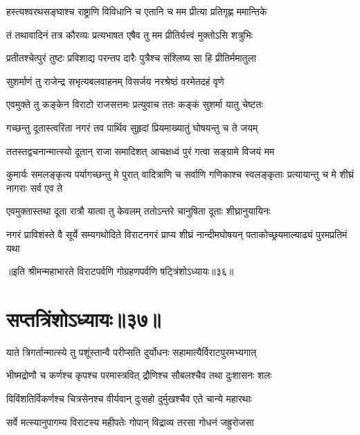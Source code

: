\twolineshloka
{हस्त्यश्वरथसङ्घाश्च राष्ट्राणि विविधानि च}
{एतानि च मम प्रीत्या प्रतिगृह्ण ममान्तिके}



\twolineshloka
{तं तथावादिनं तत्र कौरव्यः प्रत्यभाषत}
{एषैव तु मम प्रीतिर्यत्त्वं मुक्तोऽसि शत्रुभिः}


\twolineshloka
{प्रतीतश्चेत्पुरं तुष्टः प्रविशाद्य परन्तप}
{दारैः पुत्रैश्च संश्लिष्य सा हि प्रीतिर्ममातुला}


\twolineshloka
{सुशर्माणं तु राजेन्द्र सभृत्यबलवाहनम्}
{विसर्जय नरश्रेष्ठं वरमेतदहं वृणे}



\twolineshloka
{एवमुक्ते तु कङ्केन विराटो राजसत्तमः}
{प्रत्युवाच ततः कङ्कं सुशर्मा यातु चेष्टतः}


\twolineshloka
{गच्छन्तु दूतास्त्वरिता नगरं तव पार्थिव}
{सुहृदां प्रियमाख्यातुं घोषयन्तु च ते जयम्}


\twolineshloka
{ततस्तद्वचनान्मात्स्यो दूतान् राजा समादिशत्}
{आचक्षध्वं पुरं गत्वा सङ्ग्रामे विजयं मम}


\threelineshloka
{कुमार्यः समलङ्कृत्य पर्यागच्छन्तु मे पुरात्}
{वादित्राणि च सर्वाणि गणिकाश्च स्वलङ्कृताः}
{प्रत्यायान्तु च मे शीघ्रं नागराः सर्व एव ते}


\twolineshloka
{एवमुक्तास्तथा दूता रात्रौ यात्वा तु केवलम्}
{ततोऽन्तरे चानुषिता दूताः शीघ्रानुयायिनः}


\threelineshloka
{नगरं प्राविशंस्ते वै सूर्ये सम्यगथोदिते}
{विराटनगरं प्राप्य शीघ्रं नान्दीमघोषयन्}
{पताकोच्छ्रयमाल्याढ्यं पुरमप्रतिमं यथा}

॥इति श्रीमन्महाभारते विराटपर्वणि गोग्रहणपर्वणि षट्त्रिंशोऽध्यायः॥३६॥

\chapter{सप्तत्रिंशोऽध्यायः॥३७॥}

\twolineshloka
{याते त्रिगर्तान्मात्स्ये तु पशूंस्तान्वै परीप्सति}
{दुर्योधनः सहामात्यैर्विराटपुरमभ्यगात्}


\twolineshloka
{भीष्मद्रोणौ च कर्णश्च कृपश्च परमास्त्रवित्}
{द्रौणिश्च सौबलश्चैव तथा दुःशासनः शलः}


\twolineshloka
{विविंशतिर्विकर्णश्च चित्रसेनश्च वीर्यवान्}
{दुःसहो दुर्मुखश्चैव एते चान्ये महारथाः}


\twolineshloka
{सर्वे मत्स्यानुपागम्य विराटस्य महीपतेः}
{गोपान् विद्राव्य तरसा गोधनं जह्रुरोजसा}



